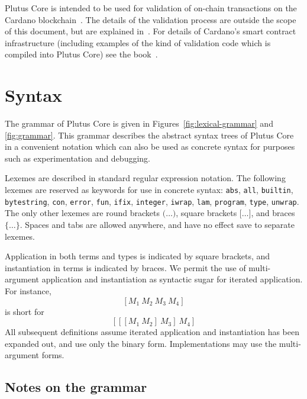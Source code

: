 \documentclass[a4paper]{article}
\begin{document}
Plutus Core is intended to be used for validation of on-chain
transactions on the Cardano blockchain~\citep{Cardano}.  The details
of the validation process are outside the scope of this document, but
are explained in~\citep{EUTXO}. For details of Cardano's smart
contract infrastructure (including examples of the kind of validation
code which is compiled into Plutus Core) see the
book~\citep{Plutus-book}.



\section{Syntax}

The grammar of Plutus Core is given in
Figures~\ref{fig:lexical-grammar} and
\ref{fig:grammar}. This grammar describes the abstract
syntax trees of Plutus Core in a convenient notation which can also be
used as concrete syntax for purposes such as experimentation and
debugging.

Lexemes are described in standard regular expression notation.  The
following lexemes are reserved as keywords for use in concrete syntax:
\texttt{abs}, \texttt{all}, \texttt{builtin}, \texttt{bytestring},
\texttt{con}, \texttt{error}, \texttt{fun}, \texttt{ifix},
\texttt{integer}, \texttt{iwrap}, \texttt{lam}, \texttt{program},
\texttt{type}, \texttt{unwrap}.  The only other lexemes
are round brackets $\texttt{(}\ldots\texttt{)}$, square brackets
$\texttt{[}\ldots\texttt{]}$, and braces
$\texttt{\{}\ldots\texttt{\}}$.  Spaces and tabs are allowed anywhere,
and have no effect save to separate lexemes.

Application in both terms and types is indicated by square
brackets, and instantiation in terms is indicated by braces. We
permit the use of multi-argument application and instantiation as
syntactic sugar for iterated application.
For instance,
\[
  [M_1 ~ M_2 ~ M_3 ~ M_4]
  \]
\noindent is short for
\[
  [[[M_1 ~ M_2] ~ M_3] ~ M_4]
\]
All subsequent definitions assume iterated application and instantiation
has been expanded out, and use only the binary form. Implementations
may use the multi-argument forms.






\newcommand\fixtype[1]{\mu\,\alpha.#1}  %

\subsection{Notes on the grammar}
\end{document}
